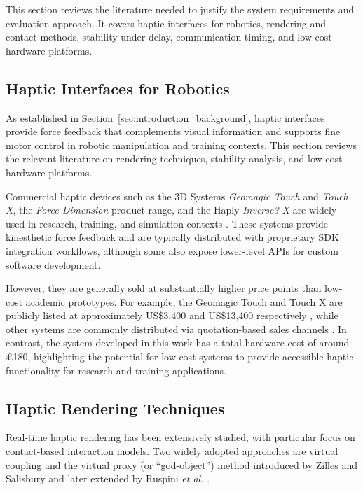 \noindent
This section reviews the literature needed to justify the system requirements and evaluation approach. It covers haptic interfaces for robotics, rendering and contact methods, stability under delay, communication timing, and low-cost hardware platforms.

\subsection{Haptic Interfaces for Robotics}

As established in Section~\ref{sec:introduction_background}, haptic interfaces provide force feedback that complements visual information and supports fine motor control in robotic manipulation and training contexts. This section reviews the relevant literature on rendering techniques, stability analysis, and low-cost hardware platforms.

Commercial haptic devices such as the 3D Systems \emph{Geomagic Touch} and \emph{Touch X}, the \emph{Force Dimension} product range, and the Haply \emph{Inverse3 X} are widely used in research, training, and simulation contexts \cite{giriApplicationBasedReviewHaptics2021}. These systems provide kinesthetic force feedback and are typically distributed with proprietary SDK integration workflows, although some also expose lower-level APIs for custom software development.

However, they are generally sold at substantially higher price points than low-cost academic prototypes. For example, the Geomagic Touch and Touch X are publicly listed at approximately US\$3{,}400 and US\$13{,}400 respectively \cite{geomagicTouchPrice,geomagicTouchXPrice}, while other systems are commonly distributed via quotation-based sales channels \cite{forceDimensionSales,haplyInverse3X}. In contrast, the system developed in this work has a total hardware cost of around £180, highlighting the potential for low-cost systems to provide accessible haptic functionality for research and training applications.

\subsection{Haptic Rendering Techniques}

Real-time haptic rendering has been extensively studied, with particular focus on contact-based interaction models. Two widely adopted approaches are virtual coupling and the virtual proxy (or ``god-object'') method introduced by Zilles and Salisbury and later extended by Ruspini \emph{et al.} \cite{zillesConstraintbasedGodobjectMethod1995,ruspiniHapticDisplayComplex1997}. 

